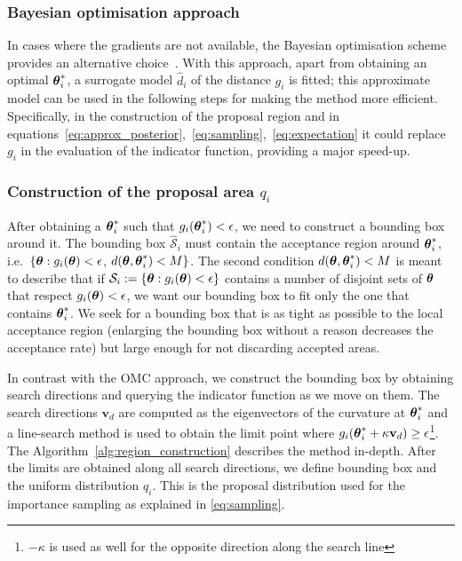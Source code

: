 \subsubsection*{Bayesian optimisation approach}
\label{subsubsec:GP_approach}

In cases where the gradients are not available, the Bayesian
optimisation scheme provides an alternative
choice~\autocite{Shahriari2016}. With this approach, apart from
obtaining an optimal $\boldsymbol{\theta}_i^* $, a surrogate model $\hat{d}_i$ of
the distance $g_i$ is fitted; this approximate model can be used in
the following steps for making the method more
efficient. Specifically, in the construction of the proposal region
and in
equations~\eqref{eq:approx_posterior},~\eqref{eq:sampling},~\eqref{eq:expectation}
it could replace $g_i$ in the evaluation of the indicator
function, providing a major speed-up.

\subsubsection*{Construction of the proposal area $q_i$}

After obtaining a $\boldsymbol{\theta}_i^*$ such that
$g_i(\boldsymbol{\theta}_i^*) < \epsilon$, we need to construct a bounding box
around it. The bounding box $\mathcal{\hat{S}}_i$ must contain the
acceptance region around $\boldsymbol{\theta}_i^*$, i.e.\
$\{ \boldsymbol{\theta} : g_i(\boldsymbol{\theta}) < \epsilon$,
$d(\boldsymbol{\theta}, \boldsymbol{\theta}_i^*) < M \}$. The second condition
$d(\boldsymbol{\theta}, \boldsymbol{\theta}_i^*) < M$ is meant to describe that if
$\mathcal{S}_i := \{ \boldsymbol{\theta} : g_i(\boldsymbol{\theta}) < \epsilon \} $ contains a
number of disjoint sets of $\boldsymbol{\theta}$ that respect
$g_i(\boldsymbol{\theta}) < \epsilon$, we want our bounding box to fit only the
one that contains $\boldsymbol{\theta}_i^*$. We seek for a bounding box that is as
tight as possible to the local acceptance region (enlarging the
bounding box without a reason decreases the acceptance rate) but large
enough for not discarding accepted areas.

In contrast with the OMC approach, we construct the bounding box by
obtaining search directions and querying the indicator function as we move on them. The
search directions $\mathbf{v}_d$ are computed as the eigenvectors of
the curvature at $\boldsymbol{\theta}_i^*$ and a line-search method is used to
obtain the limit point where
$g_i(\boldsymbol{\theta}_i^* + \kappa \mathbf{v}_d) \geq
\epsilon$\footnote{$-\kappa$ is used as well for the opposite direction along the search line}. The Algorithm~\ref{alg:region_construction} describes the method in-depth. After the limits are obtained along all
search directions, we define bounding box and the uniform distribution $q_i$. This is the proposal distribution used for the importance
sampling as explained in \eqref{eq:sampling}.


